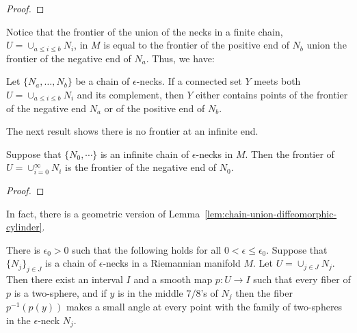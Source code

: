 \begin{proof}
\sketch
{}
\end{proof}

Notice that the frontier of the union of the necks in a finite
chain, $U=\cup_{a\le i\le b}N_i$, in $M$ is equal to the frontier of
the positive end of $N_b$ union the frontier of the negative end of
$N_a$. Thus, we have:

\begin{corollary}
\label{cor:chain-frontier}
\label{chainfrontier}

Let $\{N_a,\ldots,N_b\}$ be a chain of $\epsilon$-necks. If a
connected set $Y$ meets both $U=\cup_{a\le i\le b}N_i$ and its
complement, then $Y$ either contains  points of the frontier of the
negative end $N_a$ or of the positive  end of $N_b$.
\end{corollary}


The next result shows there is no frontier at an infinite end.

\begin{lemma}
\label{lem:infinite-chain-frontier}
\label{inffrontier}

Suppose that $\{N_0,\cdots\}$ is an infinite chain of
$\epsilon$-necks in $M$. Then the frontier of $U=\cup_{i=0}^\infty
N_i$ is the frontier of the negative end of $N_0$.
\end{lemma}

\begin{proof}
\sketch
{}
\end{proof}


 In fact, there is a geometric version of Lemma~\ref{lem:chain-union-diffeomorphic-cylinder}.

\begin{lemma}
\label{lem:chain-fibration-by-spheres}

There is $\epsilon_0>0$ such that  the following holds for all
$0<\epsilon\le \epsilon_0$. Suppose that $\{N_j\}_{j\in J}$ is a
chain of $\epsilon$-necks in a Riemannian manifold $M$. Let
$U=\cup_{j\in J}N_j$. Then there exist an interval $I$ and a smooth
map $p\colon U\to I$ such that every fiber of $p$ is a two-sphere,
and if $y$ is in the middle $7/8$'s of $N_j$ then the fiber
$p^{-1}(p(y))$ makes a small angle at every point with the family of
two-spheres in the $\epsilon$-neck $N_j$.
\end{lemma}


